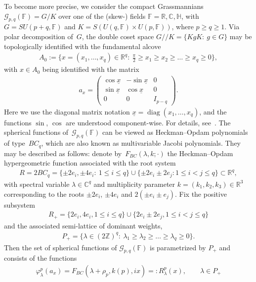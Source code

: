 \documentclass[pdftex]{sigma}
\numberwithin{equation}{section}
\DeclareMathOperator{\diag}{diag}
\begin{document}
To become more precise, we consider the compact Grassmannians $\mathcal G_{p,q}(\mathbb F)=G/K$ over one of the (skew-)
f\/ields $\mathbb F= \mathbb R, \mathbb C, \mathbb H$, with $G=SU(p+q,\mathbb F)$ and $K=S(U(q, \mathbb F)\times
U(p,\mathbb F))$, where $p\ge q\ge 1$.
Via polar decomposition of~$G$, the double coset space $G//K=\{KgK:\> g\in G\}$ may be topologically identif\/ied with the
fundamental alcove
\begin{gather*}
A_0:=\Big\{x=(x_1,\ldots,x_q)\in\mathbb R^q:\> \frac{\pi}{2}\ge x_1\ge x_2\ge\dots\ge x_q\ge0\Big\},
\end{gather*}
with $x\in A_0$ being identif\/ied with the matrix
\begin{gather*}
a_x=
\begin{pmatrix}
\cos\underline x & -\sin \underline x & 0
\\
\sin \underline x & \cos \underline x & 0
\\
0 & 0 & I_{p-q}
\end{pmatrix}
.
\end{gather*}
Here we use the diagonal matrix notation $\underline x=\diag(x_1,\ldots,x_q)$, and the functions $\sin$, $\cos$ are
understood component-wise.
For details, see~\cite[Theorem~4.1]{RR}.
The spherical functions of~$\mathcal G_{p,q}(\mathbb F)$ can be viewed as Heckman--Opdam polynomials of type~$BC_q$,
which are also known as multivariable Jacobi polynomials.
They may be described as follows: denote by~$F_{BC}(\lambda,k;\cdot)$ the Heckman--Opdam hypergeometric function
associated with the root system
\begin{gather*}
R=2  BC_q=\{\pm 2e_i, \pm 4 e_i: \> 1\leq i\le q\}\cup\{\pm 2e_i \pm 2e_j: 1\leq i < j \leq q\} \subset \mathbb R^q,
\end{gather*}
with spectral variable $\lambda\in\mathbb C^q$ and multiplicity parameter $k=(k_1, k_2, k_3)\in \mathbb R^3$
corresponding to the roots $\pm 2 e_i$, $\pm 4 e_i$ and $2(\pm e_i\pm e_j)$.
Fix the positive subsystem
\begin{gather*}
R_+=\{2e_i, 4e_i, 1\leq i \leq q\}\cup\{2e_i\pm 2e_j, 1\leq i<j \leq q\}
\end{gather*}
and the associated semi-lattice of dominant weights,
\begin{gather*}
P_+=\big\{\lambda\in (2\mathbb Z)^q: \> \lambda_1\ge\lambda_2\ge\dots\ge\lambda_q\ge0\big\}.
\end{gather*}
Then the set of spherical functions of $\mathcal G_{p,q}(\mathbb F)$ is parametrized by $P_+$ and consists of the
functions
\begin{gather}
\label{jacobi-pol-def}
\varphi_\lambda^p(a_x)=F_{BC}(\lambda+\rho_p, k(p),ix)=: R_\lambda^p(x),
\qquad
\lambda\in P_+
\end{gather}
\end{document}
